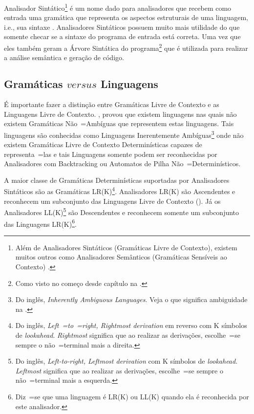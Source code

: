 Analisador Sintático\footnote{
Além de Analisadores Sintáticos (Gramáticas Livre de Contexto),
existem muitos outros como Analisadores Semânticos (Gramáticas Sensíveis ao Contexto) \cite{contextSensitiveParsing}.
}
é um nome dado para analisadores que recebem como entrada uma gramática que representa os aspectos estruturais de uma linguagem,
i.e.,
sua sintaxe \cite{ahoCompilerDragonBook}.
Analisadores Sintáticos possuem muito mais utilidade do que somente checar se a sintaxe do programa de entrada está correta.
Uma vez que eles também geram a Árvore Sintática do programa\footnote{
Como visto no começo desde capítulo na .
}
que é utilizada para realizar a análise semântica e
geração de código.


\subsection{Gramáticas $versus$ Linguagens}
\label{gramaticasVersusLinguagens}

É importante fazer a distinção entre Gramáticas Livre de Contexto e
as Linguagens Livre de Contexto.
,
provou que existem linguagens nas quais não existem Gramáticas Não~=Ambíguas que representem estas linguagens.
Tais linguagens são conhecidas como Linguagens Inerentemente Ambíguas\footnote{
Do inglês,
\textit{Inherently Ambiguous Languages}.
Veja o que significa ambiguidade na .
}
onde não existem Gramáticas Livre de Contexto Determinísticas capazes de representa~=las e
tais Linguagens somente podem ser reconhecidas por Analisadores com Backtracking \cite{ahoCompilerDragonBook} ou
Automatos de Pilha Não~=Determinísticos.

A maior classe de Gramáticas Determinísticas suportadas por Analisadores Sintáticos são as Gramáticas LR(K)\footnote{
Do inglês, \textit{Left~=to~=right,
Rightmost derivation} em reverso com K símbolos de \textit{lookahead}.
\textit{Rightmost} significa que ao realizar as derivações,
escolhe~=se sempre o não~=terminal mais a direita.
}.
Analisadores LR(K) \cite{ahoCompilerDragonBook} são Ascendentes e
reconhecem um subconjunto das Linguagens Livre de Contexto ().
Já os Analisadores LL(K)\footnote{
Do inglês, \textit{Left-to-right,
Leftmost derivation} com K símbolos de \textit{lookahead}.
\textit{Leftmost} significa que ao realizar as derivações,
escolhe~=se sempre o não~=terminal mais a esquerda.
}
são Descendentes \cite{antlrBookTerrentParr,llStarAntlr,allStarAntlr} e
reconhecem somente um subconjunto das Linguagens LR(K)\footnote{
Diz~=se que uma linguagem é LR(K) ou
LL(K) quando ela é reconhecida por este analisador.
}.


